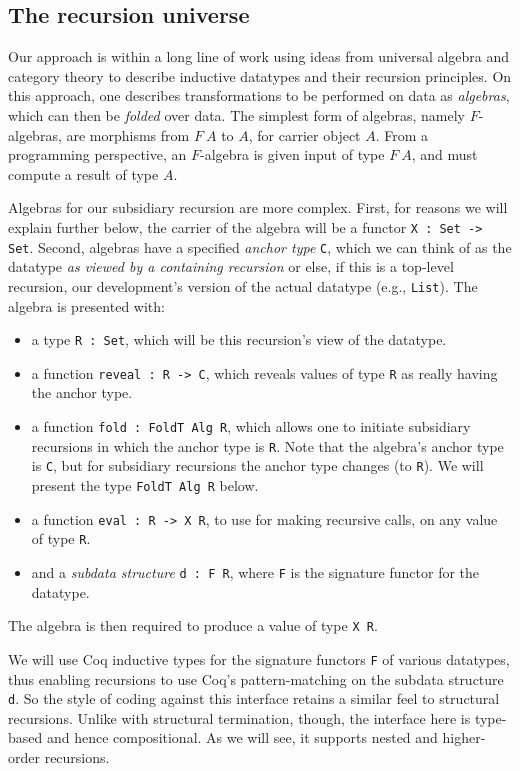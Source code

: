 \documentclass[a4paper,USenglish]{lipics-v2021}
\begin{document}
\subsection{The recursion universe}

Our approach is within a long line of work using ideas from universal
algebra and category theory to describe inductive datatypes and their
recursion principles.  On this approach, one describes transformations
to be performed on data as \emph{algebras}, which can then be
\textit{folded} over data.  The simplest form of algebras, namely
$F$-algebras, are morphisms from $F\ A$ to $A$, for carrier object
$A$.  From a programming perspective, an $F$-algebra is given input of
type $F\ A$, and must compute a result of type $A$.

Algebras for our subsidiary recursion are more complex.  First, for
reasons we will explain further below, the carrier of the algebra will
be a functor \verb|X : Set -> Set|.  Second, algebras have a specified
\emph{anchor type} \verb|C|, which we can think of as the datatype
\emph{as viewed by a containing recursion} or else, if this is a
top-level recursion, our development's version of the actual datatype
(e.g., \verb|List|).  The algebra is presented with:

\begin{itemize}
\item a type \verb|R : Set|, which will be this recursion's view of the datatype.
\item a function \verb|reveal : R -> C|, which reveals values of type \verb|R| as really having the anchor type.  
\item a function \verb|fold : FoldT Alg R|, which allows one to initiate subsidiary recursions in which the anchor type is \verb|R|.  Note that the algebra's anchor type is \verb|C|, but for subsidiary recursions the anchor type changes (to \verb|R|). We will present the type \verb|FoldT Alg R| below.
\item a function \verb|eval : R -> X R|, to use for making recursive calls, on any value of type \verb|R|.
\item and a \emph{subdata structure} \verb|d : F R|, where \verb|F| is the signature functor for the datatype.
\end{itemize}

\noindent The algebra is then required to produce a value of type \verb|X R|.

We will use Coq inductive types for the signature functors \verb|F| of
various datatypes, thus enabling recursions to use Coq's
pattern-matching on the subdata structure \verb|d|.  So the style of
coding against this interface retains a similar feel to structural
recursions.  Unlike with structural termination, though, the interface
here is type-based and hence compositional.  As we will see, it
supports nested and higher-order recursions.
\end{document}
